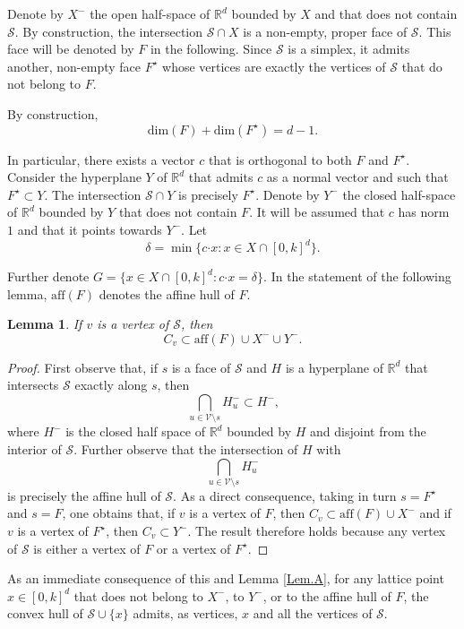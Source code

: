 \documentclass[a4paper]{article}
\newtheorem{lemma}{Lemma}[subsection]
\renewcommand{\S}{\mathcal{S}}
\begin{document}
Denote by $X^-$ the open half-space of $\mathbb{R}^d$ bounded by $X$ and that does not contain $\S$. By construction, the intersection $\S\cap{X}$ is a non-empty, proper face of $\S$. This face will be denoted by $F$ in the following. Since $\S$ is a simplex, it admits another, non-empty face $F^\star$ whose vertices are exactly the vertices of $\S$ that do not belong to $F$.

By construction,
$$
\mathrm{dim}(F)+\mathrm{dim}(F^\star)=d-1\mbox{.}
$$

In particular, there exists a vector $c$ that is orthogonal to both $F$ and $F^\star$. Consider the hyperplane $Y$ of $\mathbb{R}^d$ that admits $c$ as a normal vector and such that $F^\star\subset{Y}$. The intersection $\S\cap{Y}$ is precisely $F^\star$. Denote by $Y^-$ the closed half-space of $\mathbb{R}^d$ bounded by $Y$ that does not contain $F$. It will be assumed that $c$ has norm $1$ and that it points towards $Y^-$. Let
\begin{equation}\label{eq.A}
\delta=\min\{c\mathord{\cdot}x:x\in{X\cap[0,k]^d}\}\mbox{.}
\end{equation}

Further denote $G=\{x\in{X\cap[0,k]^d}:c\mathord{\cdot}x=\delta\}$. In the statement of the following lemma, $\mathrm{aff}(F)$ denotes the affine hull of $F$.

\begin{lemma}\label{Lem.B}
  If $v$ is a vertex of $\S$, then
  $$
  C_v\subset\mathrm{aff}(F)\cup{X^-}\cup{Y^-}\mbox{.}
  $$
\end{lemma}

\begin{proof}
  First observe that, if $s$ is a face of $\S$ and $H$ is a hyperplane of $\mathbb{R}^d$ that intersects $\S$ exactly along $s$, then
  $$
  \bigcap_{u\in\mathcal{V}\mathord{\setminus}s}H_u^-\subset{H^-}\mbox{,}
  $$
  where $H^-$ is the closed half space of $\mathbb{R}^d$ bounded by $H$ and disjoint from the interior of $\S$. Further observe that the intersection of $H$ with
  $$
  \bigcap_{u\in\mathcal{V}\mathord{\setminus}s}H_u^-
  $$
  is precisely the affine hull of $\S$. As a direct consequence, taking in turn $s=F^\star$ and $s=F$, one obtains that, if $v$ is a vertex of $F$, then $C_v\subset\mathrm{aff}(F)\cup{X^-}$ and if $v$ is a vertex of $F^\star$, then $C_v\subset{Y^-}$. The result therefore holds because any vertex of $\S$ is either a vertex of $F$ or a vertex of $F^\star$.
\end{proof}

As an immediate consequence of this and Lemma \ref{Lem.A}, for any lattice point $x\in[0,k]^d$ that does not belong to $X^-$, to $Y^-$, or to the affine hull of $F$, the convex hull of $\S\cup\{x\}$ admits, as vertices, $x$ and all the vertices of $\S$.
\end{document}
